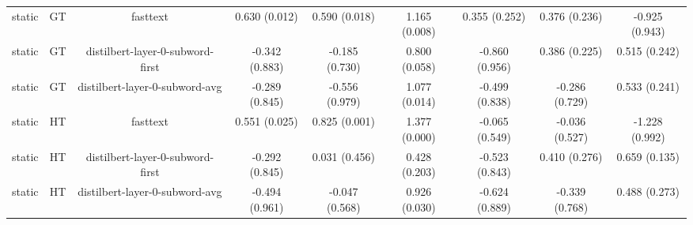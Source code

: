 \begin{sidewaystable}[htb]
\begin{tabular}{@{}ccccccccc@{}}
        static & GT & fasttext & 0.630 (0.012) & 0.590 (0.018) & 1.165 (0.008) & 0.355 (0.252) & 0.376 (0.236) & -0.925 (0.943) \\
        static & GT & distilbert-layer-0-subword-first & -0.342 (0.883) & -0.185 (0.730) & 0.800 (0.058) & -0.860 (0.956) & 0.386 (0.225) & 0.515 (0.242) \\
        static & GT & distilbert-layer-0-subword-avg & -0.289 (0.845) & -0.556 (0.979) & 1.077 (0.014) & -0.499 (0.838) & -0.286 (0.729) & 0.533 (0.241) \\
        static & HT & fasttext & 0.551 (0.025) & 0.825 (0.001) & 1.377 (0.000) & -0.065 (0.549) & -0.036 (0.527) & -1.228 (0.992) \\
        static & HT & distilbert-layer-0-subword-first & -0.292 (0.845) & 0.031 (0.456) & 0.428 (0.203) & -0.523 (0.843) & 0.410 (0.276) & 0.659 (0.135) \\
        static & HT & distilbert-layer-0-subword-avg & -0.494 (0.961) & -0.047 (0.568) & 0.926 (0.030) & -0.624 (0.889) & -0.339 (0.768) & 0.488 (0.273) \\
        \bottomrule
    \end{tabular}
\end{sidewaystable}